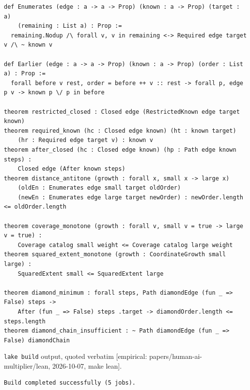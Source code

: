 \documentclass[11pt]{article}
\newcommand{\emp}[1]{\textcolor{bucketgray}{\footnotesize [empirical: #1]}}
\begin{document}
\begin{lstlisting}[style=bucketlean]
def Enumerates (edge : a -> a -> Prop) (known : a -> Prop) (target : a)
    (remaining : List a) : Prop :=
  remaining.Nodup /\ forall v, v in remaining <-> Required edge target v /\ ~ known v

def Earlier (edge : a -> a -> Prop) (known : a -> Prop) (order : List a) : Prop :=
  forall before v rest, order = before ++ v :: rest -> forall p, edge p v -> known p \/ p in before

theorem restricted_closed : Closed edge (RestrictedKnown edge target known)
theorem required_known (hc : Closed edge known) (ht : known target)
    (hr : Required edge target v) : known v
theorem after_closed (hc : Closed edge known) (hp : Path edge known steps) :
    Closed edge (After known steps)
theorem distance_antitone (growth : forall x, small x -> large x)
    (oldEn : Enumerates edge small target oldOrder)
    (newEn : Enumerates edge large target newOrder) : newOrder.length <= oldOrder.length

theorem coverage_monotone (growth : forall v, small v = true -> large v = true) :
    Coverage catalog small weight <= Coverage catalog large weight
theorem squared_extent_monotone (growth : CoordinateGrowth small large) :
    SquaredExtent small <= SquaredExtent large

theorem diamond_minimum : forall steps, Path diamondEdge (fun _ => False) steps ->
    After (fun _ => False) steps .target -> diamondOrder.length <= steps.length
theorem diamond_chain_insufficient : ~ Path diamondEdge (fun _ => False) diamondChain
\end{lstlisting}

\texttt{lake build} output, quoted verbatim \emp{papers/human-ai-multiplier/lean, 2026-10-07, make lean}.
\begin{verbatim}
Build completed successfully (5 jobs).
\end{verbatim}
\end{document}
